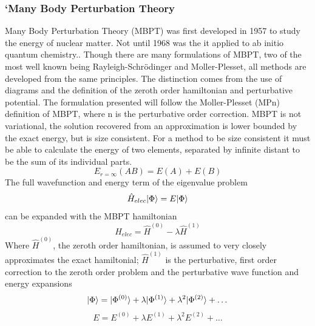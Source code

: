     \subsubsection{`Many Body Perturbation Theory}
      Many Body Perturbation Theory (MBPT) was first developed in 1957\cite{Brueckner, 1955} to study the energy of nuclear matter.  Not until 1968 was the it applied to ab initio quantum chemistry.\cite{Freed 1968, Freed 1971}.  Though there are many formulations of MBPT, two of the most well known being Rayleigh-Schr{\"o}dinger\cite{Lindgren 1974} and M{\/o}ller-Plesset\cite{Moller 1934, Raghavachari 1989}, all methods are developed from the same principles.  The distinction comes from the use of diagrams and the definition of the zeroth order hamiltonian and perturbative potential.  The formulation presented will follow the M{\/o}ller-Plesset (MPn) definition of MBPT, where n is the perturbative order correction. MBPT is not variational, the solution recovered from an approximation is lower bounded by the exact energy, but is size consistent. For a method to be size consistent it must be able to calculate the energy of two elements, separated by infinite distant to be the sum of its individual parts.  
        \begin{equation}
        	E_{r=\infty}(AB) = E(A) + E(B)
        \end{equation}
      The full wavefunction and energy term of the eigenvalue problem 
        \begin{equation}
        	\hat{H}_{elec}| \Phi \rangle =  E| \Phi \rangle
        \end{equation}
      can be expanded with the MBPT hamiltonian
      \begin{equation}
      	\hat{H}_{elec} = \hat{H}^{(0)} - \lambda \hat{H}^{(1)}
      \end{equation}
      Where $\hat{H}^{(0)}$, the zeroth order hamiltonian, is assumed to very closely approximates the exact hamiltonial; $\hat{H}^{(1)}$ is the perturbative, first order correction to the zeroth order problem and the perturbative wave function and energy expansions
        \begin{equation}
        	| \Phi \rangle = | \Phi^{(0)} \rangle + \lambda | \Phi^{(1)} \rangle +  \lambda^2 | \Phi^{(2)} \rangle + \dots\\
        \end{equation}
        \begin{equation}
        	E = E^{(0)} + \lambda E^{(1)} + \lambda^2 E^{(2)} + \dots
        \end{equation}
